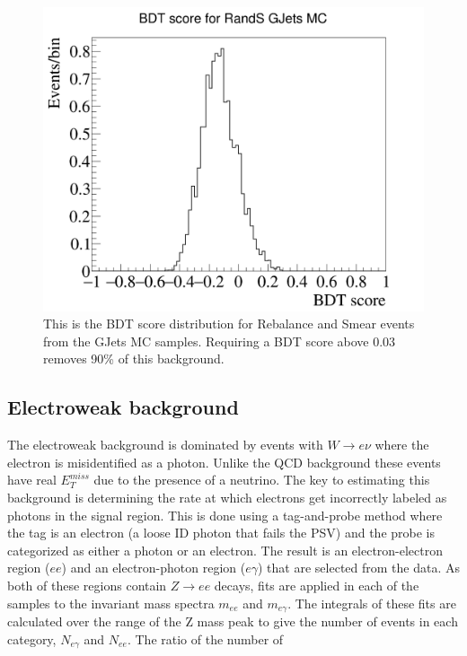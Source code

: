 \begin{figure}[h]
	\centering
	\includegraphics[width=0.7\linewidth]{Figures/BDT_Gjets}
	\caption[BDT response to Rebalance and Smear events in GJets MC]{This is the BDT score distribution for Rebalance and Smear events from the GJets MC samples. Requiring a BDT score above 0.03 removes 90\% of this background.}
	\label{fig:bdtgjets}
\end{figure}


\subsection{Electroweak background}
The electroweak background is dominated by events with $W \rightarrow e \nu$ where the electron is misidentified as a photon.  Unlike the QCD background these events have  real $E^{miss}_T$ due to the presence of a neutrino.  The key to estimating this background is determining the rate at which electrons get incorrectly labeled as photons in the signal region.  This is done using a tag-and-probe method where the tag is an electron (a loose ID photon that fails the PSV) and the probe is categorized as either a photon or an electron.  The result is an electron-electron region ($ee$) and an electron-photon region ($e\gamma$) that are selected from the data.    As both of these regions contain $Z\rightarrow ee$ decays, fits are applied in each of the samples to the invariant mass spectra $m_{ee}$ and $m_{e\gamma}$.  The integrals of these fits are calculated over the range of the Z mass peak to give the number of events in each category, $N_{e\gamma}$ and $N_{ee}$.  The ratio of the number of 


